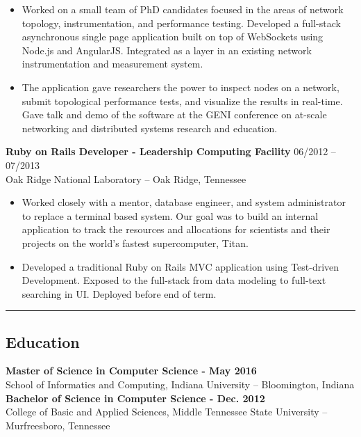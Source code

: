 \documentclass[12pt,letterpaper]{article}
\begin{document}
\begin{itemize}

  \item Worked on a small team of PhD candidates focused in the areas of network topology, instrumentation, and performance testing. Developed a full-stack asynchronous single page application built on top of WebSockets using Node.js and AngularJS. Integrated as a layer in an existing network instrumentation and measurement system.

  \item The application gave researchers the power to inspect nodes on a network, submit topological performance tests, and visualize the results in real-time. Gave talk and demo of the software at the GENI conference on at-scale networking and distributed systems research and education.

\end{itemize}


\noindent\textbf{Ruby on Rails Developer - Leadership Computing Facility}
\hfill{06/2012 -- 07/2013} \\
Oak Ridge National Laboratory -- Oak Ridge, Tennessee

\begin{itemize}

	\item Worked closely with a mentor, database engineer, and system administrator to replace a terminal based system. Our goal was to build an internal application to track the resources and allocations for scientists and their projects on the world’s fastest supercomputer, Titan.

  \item Developed a traditional Ruby on Rails MVC application using Test-driven Development. Exposed to the full-stack from data modeling to full-text searching in UI. Deployed before end of term.

\end{itemize}

\noindent\rule{7.5in}{0.4pt}

\subsection*{Education}

\textbf{Master of Science in Computer Science - May 2016} \\
\bigskip School of Informatics and Computing, Indiana University -- Bloomington, Indiana \\
\noindent\textbf{Bachelor of Science in Computer Science - Dec. 2012} \\
College of Basic and Applied Sciences, Middle Tennessee State University -- Murfreesboro, Tennessee
\end{document}

